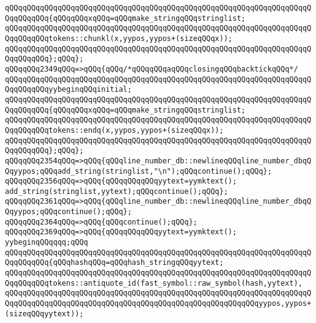 \verb|qQQqqQQqqQQqqQQqqQQqqQQqqQQqqQQqqQQqqQQqqQQqqQQqqQQqqQQqqQQqqQQqqQQqqQQqqQQqqQQq{qQQqqQQqxqQQq=qQQqmake_stringqQQqstringlist;|\newline
\newline
\verb|qQQqqQQqqQQqqQQqqQQqqQQqqQQqqQQqqQQqqQQqqQQqqQQqqQQqqQQqqQQqqQQqqQQqqQQqqQQqqQQqtokens::chunkl(x,yypos,yypos+(sizeqQQqx));|\newline
\verb|qQQqqQQqqQQqqQQqqQQqqQQqqQQqqQQqqQQqqQQqqQQqqQQqqQQqqQQqqQQqqQQqqQQqqQQqqQQqqQQq};qQQq};|\newline
\verb|qQQqqQQq2349qQQq=>qQQq{qQQq/*qQQqqQQqaqQQqclosingqQQqbacktickqQQq*/|\newline
\verb|qQQqqQQqqQQqqQQqqQQqqQQqqQQqqQQqqQQqqQQqqQQqqQQqqQQqqQQqqQQqqQQqqQQqqQQqqQQqqQQqyybeginqQQqinitial;|\newline
\verb|qQQqqQQqqQQqqQQqqQQqqQQqqQQqqQQqqQQqqQQqqQQqqQQqqQQqqQQqqQQqqQQqqQQqqQQqqQQqqQQq{qQQqqQQqxqQQq=qQQqmake_stringqQQqstringlist;|\newline
\verb|qQQqqQQqqQQqqQQqqQQqqQQqqQQqqQQqqQQqqQQqqQQqqQQqqQQqqQQqqQQqqQQqqQQqqQQqqQQqqQQqtokens::endq(x,yypos,yypos+(sizeqQQqx));|\newline
\verb|qQQqqQQqqQQqqQQqqQQqqQQqqQQqqQQqqQQqqQQqqQQqqQQqqQQqqQQqqQQqqQQqqQQqqQQqqQQqqQQq};qQQq};|\newline
\verb|qQQqqQQq2354qQQq=>qQQq{qQQqline_number_db::newlineqQQqline_number_dbqQQqyypos;qQQqadd_string(stringlist,"\n");qQQqcontinue();qQQq};|\newline
\verb|qQQqqQQq2356qQQq=>qQQq{qQQqqQQqqQQqyytext=yymktext();|\newline
\verb|add_string(stringlist,yytext);qQQqcontinue();qQQq};|\newline
\verb|qQQqqQQq2361qQQq=>qQQq{qQQqline_number_db::newlineqQQqline_number_dbqQQqyypos;qQQqcontinue();qQQq};|\newline
\verb|qQQqqQQq2364qQQq=>qQQq{qQQqcontinue();qQQq};|\newline
\verb|qQQqqQQq2369qQQq=>qQQq{qQQqqQQqqQQqyytext=yymktext();|\newline
\verb|yybeginqQQqqqq;qQQq|\newline
\verb|qQQqqQQqqQQqqQQqqQQqqQQqqQQqqQQqqQQqqQQqqQQqqQQqqQQqqQQqqQQqqQQqqQQqqQQqqQQqqQQq{qQQqhashqQQq=qQQqhash_stringqQQqyytext;|\newline
\newline
\verb|qQQqqQQqqQQqqQQqqQQqqQQqqQQqqQQqqQQqqQQqqQQqqQQqqQQqqQQqqQQqqQQqqQQqqQQqqQQqqQQqtokens::antiquote_id(fast_symbol::raw_symbol(hash,yytext),|\newline
\verb|qQQqqQQqqQQqqQQqqQQqqQQqqQQqqQQqqQQqqQQqqQQqqQQqqQQqqQQqqQQqqQQqqQQqqQQqqQQqqQQqqQQqqQQqqQQqqQQqqQQqqQQqqQQqqQQqqQQqqQQqqQQqqQQqyypos,yypos+(sizeqQQqyytext));|\newline
